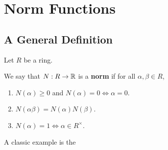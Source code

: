 \section{Norm Functions}\label{Ch2:Sec:Norms}

\subsection{A General Definition}

Let $R$ be a ring.

\begin{boxdefinition}[Norm]
    We say that $N : R \to \mathbb{R}$ is a \textbf{norm} if for all $\alpha, \beta \in R$,
    \begin{enumerate}[noitemsep]
        \item $N(\alpha) \geq 0$ and $N(\alpha) = 0 \iff \alpha = 0$.
        \item $N(\alpha \beta) = N(\alpha) N(\beta)$.
        \item $N(\alpha) = 1 \iff \alpha \in R^{\times}$.
    \end{enumerate}
\end{boxdefinition}

A classic example is the 

